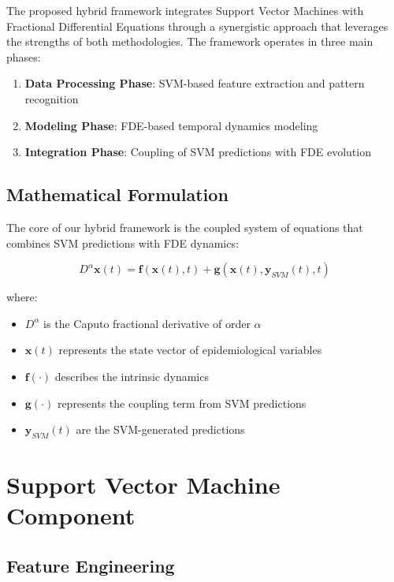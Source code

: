 \documentclass[12pt,a4paper]{report}
\begin{document}
The proposed hybrid framework integrates Support Vector Machines with Fractional Differential Equations through a synergistic approach that leverages the strengths of both methodologies. The framework operates in three main phases:

\begin{enumerate}
    \item \textbf{Data Processing Phase}: SVM-based feature extraction and pattern recognition
    \item \textbf{Modeling Phase}: FDE-based temporal dynamics modeling
    \item \textbf{Integration Phase}: Coupling of SVM predictions with FDE evolution
\end{enumerate}

\subsection{Mathematical Formulation}

The core of our hybrid framework is the coupled system of equations that combines SVM predictions with FDE dynamics:

\begin{equation}
D^\alpha \mathbf{x}(t) = \mathbf{f}(\mathbf{x}(t), t) + \mathbf{g}(\mathbf{x}(t), \mathbf{y}_{SVM}(t), t)
\end{equation}

where:
\begin{itemize}
    \item $D^\alpha$ is the Caputo fractional derivative of order $\alpha$
    \item $\mathbf{x}(t)$ represents the state vector of epidemiological variables
    \item $\mathbf{f}(\cdot)$ describes the intrinsic dynamics
    \item $\mathbf{g}(\cdot)$ represents the coupling term from SVM predictions
    \item $\mathbf{y}_{SVM}(t)$ are the SVM-generated predictions
\end{itemize}

\section{Support Vector Machine Component}

\subsection{Feature Engineering}
\end{document}
